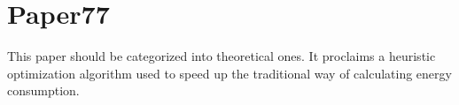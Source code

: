 \documentclass{article}
\begin{document}
\section{Paper77}
\label{sec:paper77}

This paper should be categorized into theoretical ones. It proclaims a
heuristic optimization algorithm used to speed up the traditional way
of calculating energy consumption.
\end{document}
